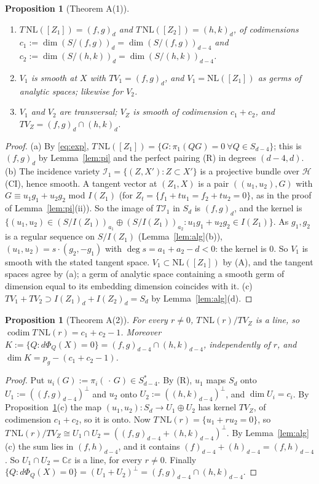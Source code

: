 \documentclass[11pt]{article}
\numberwithin{equation}{section}
\newtheorem{proposition}[theorem]{Proposition}
\theoremstyle{remark}
\newcommand{\CC}{\mathbb{C}}
\newcommand{\NL}{\mathrm{NL}}
\newcommand{\VZ}{V_Z}
\newcommand{\cI}{\mathcal{I}}
\newcommand{\cH}{\mathcal{H}}
\newcommand{\codim}{\operatorname{codim}}
\begin{document}
\begin{proposition}[Theorem A(1)]\label{prop:first}
\begin{enumerate}[label=\textup{(\alph*)}]
\item $T\,\NL([Z_1])=(f,g)_d$ and $T\,\NL([Z_2])=(h,k)_d$, of codimensions
$c_1:=\dim(S/(f,g))_d=\dim(S/(f,g))_{d-4}$ and $c_2:=\dim(S/(h,k))_d=\dim(S/(h,k))_{d-4}$.
\item $V_1$ is smooth at $X$ with $TV_1=(f,g)_d$, and $V_1=\NL([Z_1])$ as germs of analytic spaces; likewise
for $V_2$.
\item $V_1$ and $V_2$ are transversal; $\VZ$ is smooth of codimension $c_1+c_2$, and $T\VZ=(f,g)_d\cap(h,k)_d$.
\end{enumerate}
\end{proposition}
\begin{proof}
(a) By \eqref{eq:exp}, $T\,\NL([Z_1])=\{G:\pi_1(QG)=0\ \forall Q\in S_{d-4}\}$; this is $(f,g)_d$ by
Lemma~\ref{lem:pi} and the perfect pairing (R) in degrees $(d-4,d)$.
(b) The incidence variety $\cI_1=\{(Z,X'):Z\subset X'\}$ is a projective bundle over $\cH$ (CI), hence smooth. A
tangent vector at $(Z_1,X)$ is a pair $((u_1,u_2),G)$ with $G\equiv u_1g_1+u_2g_2$ mod $I(Z_1)$ (for
$Z_t=\{f_1+tu_1=f_2+tu_2=0\}$, as in the proof of Lemma~\ref{lem:pi}(ii)). So the image of $T\cI_1$ in $S_d$ is
$(f,g)_d$, and the kernel is
$\{(u_1,u_2)\in(S/I(Z_1))_{a_1}\oplus(S/I(Z_1))_{a_2}:u_1g_1+u_2g_2\in I(Z_1)\}$. As $g_1,g_2$ is a regular
sequence on $S/I(Z_1)$ (Lemma~\ref{lem:alg}(b)), $(u_1,u_2)=s\cdot(g_2,-g_1)$ with $\deg s=a_1+a_2-d<0$: the
kernel is $0$. So $V_1$ is smooth with the stated tangent space. $V_1\subset\NL([Z_1])$ by (A), and the tangent
spaces agree by (a); a germ of analytic space containing a smooth germ of dimension equal to its embedding
dimension coincides with it.
(c) $TV_1+TV_2\supset I(Z_1)_d+I(Z_2)_d=S_d$ by Lemma~\ref{lem:alg}(d).
\end{proof}

\begin{proposition}[Theorem A(2)]\label{prop:excess}
For every $r\ne0$, $T\,\NL(r)/T\VZ$ is a line, so $\codim T\,\NL(r)=c_1+c_2-1$. Moreover
$K:=\{Q:d\Phi_Q(X)=0\}=(f,g)_{d-4}\cap(h,k)_{d-4}$, independently of $r$, and $\dim K=p_g-(c_1+c_2-1)$.
\end{proposition}
\begin{proof}
Put $u_i(G):=\pi_i(\,\cdot\,G)\in S_{d-4}^*$. By (R), $u_1$ maps $S_d$ onto $U_1:=((f,g)_{d-4})^\perp$ and $u_2$
onto $U_2:=((h,k)_{d-4})^\perp$, and $\dim U_i=c_i$. By Proposition~\ref{prop:first}(c) the map
$(u_1,u_2)\colon S_d\to U_1\oplus U_2$ has kernel $T\VZ$, of codimension $c_1+c_2$, so it is onto. Now
$T\,\NL(r)=\{u_1+ru_2=0\}$, so $T\,\NL(r)/T\VZ\cong U_1\cap U_2=((f,g)_{d-4}+(h,k)_{d-4})^\perp$. By
Lemma~\ref{lem:alg}(c) the sum lies in $(f,h)_{d-4}$, and it contains $(f)_{d-4}+(h)_{d-4}=(f,h)_{d-4}$. So
$U_1\cap U_2=\CC\varepsilon$ is a line, for every $r\ne0$. Finally
$\{Q:d\Phi_Q(X)=0\}=(U_1+U_2)^\perp=(f,g)_{d-4}\cap(h,k)_{d-4}$.
\end{proof}
\end{document}
